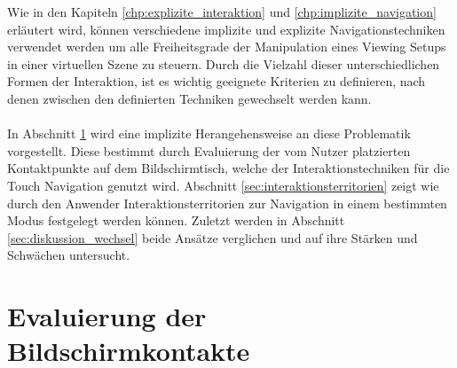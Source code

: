 Wie in den Kapiteln \ref{chp:explizite_interaktion} und \ref{chp:implizite_navigation} erläutert wird, können verschiedene implizite und explizite Navigationstechniken verwendet werden um alle Freiheitsgrade der Manipulation eines Viewing Setups in einer virtuellen Szene zu steuern. Durch die Vielzahl dieser unterschiedlichen Formen der Interaktion, ist es wichtig geeignete Kriterien zu definieren, nach denen zwischen den definierten Techniken gewechselt werden kann. 
\\\\
In Abschnitt \ref{sec:evaluierung_der_bildschirmkontakte} wird eine implizite Herangehensweise an diese Problematik vorgestellt. Diese bestimmt durch Evaluierung der vom Nutzer platzierten Kontaktpunkte auf dem Bildschirmtisch, welche der Interaktionstechniken für die Touch Navigation genutzt wird. Abschnitt \ref{sec:interaktionsterritorien} zeigt wie durch den Anwender Interaktionsterritorien zur Navigation in einem bestimmten Modus festgelegt werden können. Zuletzt werden in Abschnitt \ref{sec:diskussion_wechsel} beide Ansätze verglichen und auf ihre Stärken und Schwächen untersucht.



\section{Evaluierung der Bildschirmkontakte}
\label{sec:evaluierung_der_bildschirmkontakte}

